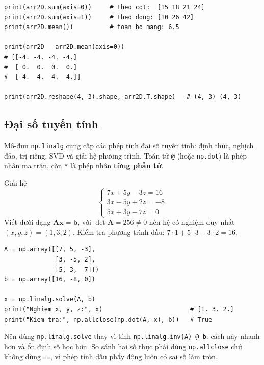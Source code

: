 \begin{lstlisting}[caption={Tổng hợp theo axis và broadcasting}]
print(arr2D.sum(axis=0))     # theo cot:  [15 18 21 24]
print(arr2D.sum(axis=1))     # theo dong: [10 26 42]
print(arr2D.mean())          # toan bo mang: 6.5

print(arr2D - arr2D.mean(axis=0))
# [[-4. -4. -4. -4.]
#  [ 0.  0.  0.  0.]
#  [ 4.  4.  4.  4.]]

print(arr2D.reshape(4, 3).shape, arr2D.T.shape)   # (4, 3) (4, 3)
\end{lstlisting}

\subsection{Đại số tuyến tính}

Mô-đun \texttt{np.linalg} cung cấp các phép tính đại số tuyến tính: định thức, nghịch đảo, trị riêng, SVD và giải hệ phương trình. Toán tử \texttt{@} (hoặc \texttt{np.dot}) là phép nhân ma trận, còn \texttt{*} là phép nhân \textbf{từng phần tử}.

\begin{example}
Giải hệ
\[
\begin{cases}
7x + 5y - 3z = 16 \\
3x - 5y + 2z = -8 \\
5x + 3y - 7z = 0
\end{cases}
\]
Viết dưới dạng $\mathbf{A}\mathbf{x} = \mathbf{b}$, với $\det\mathbf{A} = 256 \neq 0$ nên hệ có nghiệm duy nhất $(x, y, z) = (1, 3, 2)$. Kiểm tra phương trình đầu: $7 \cdot 1 + 5 \cdot 3 - 3 \cdot 2 = 16$.
\end{example}

\begin{lstlisting}[caption={Giải hệ phương trình bằng np.linalg.solve}]
A = np.array([[7, 5, -3],
              [3, -5, 2],
              [5, 3, -7]])
b = np.array([16, -8, 0])

x = np.linalg.solve(A, b)
print("Nghiem x, y, z:", x)                        # [1. 3. 2.]
print("Kiem tra:", np.allclose(np.dot(A, x), b))   # True
\end{lstlisting}

\noindent Nên dùng \texttt{np.linalg.solve} thay vì tính \texttt{np.linalg.inv(A) @ b}: cách này nhanh hơn và ổn định số học hơn. So sánh hai số thực phải dùng \texttt{np.allclose} chứ không dùng \texttt{==}, vì phép tính dấu phẩy động luôn có sai số làm tròn.

